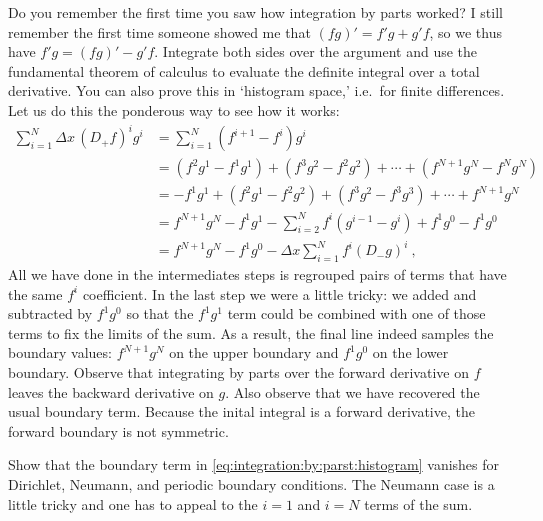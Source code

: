 \begin{example}
Do you remember the first time you saw how integration by parts worked? I still remember the first time someone showed me that $(fg)' = f'g + g'f$, so we thus have $f'g = (fg)' - g'f$. Integrate both sides over the argument and use the fundamental theorem of calculus to evaluate the definite integral over a total derivative. You can also prove this in `histogram space,' i.e.\ for finite differences. Let us do this the ponderous way to see how it works:
\begin{align}
    \sum_{i=1}^N\Delta x\, (D_+f)^i g^i
    &= \sum_{i=1}^N \left(f^{i+1}-f^{i}\right)g^i
    \\
    &= \left(f^2 g^1 - f^1 g^1\right) 
        + \left(f^3 g^2 - f^2 g^2\right) 
        + \cdots
        + \left(f^{N+1} g^N - f^N g^N\right) 
    \\
    &=  - f^1 g^1 
        + \left(f^2 g^1 - f^2 g^2 \right) 
        + \left(f^3 g^2 - f^3 g^3 \right) 
        + \cdots
        + f^{N+1} g^N
    \\
    &= f^{N+1} g^N -  f^1 g^1   -\sum_{i=2}^N f^i\left(g^{i-1} - g^i \right)
    + f^1g^0 - f^1g^0
    \\
    &= f^{N+1} g^N -  f^1 g^0   -\Delta x\sum_{i=1}^N f^i (D_-g)^i \ ,
    \label{eq:integration:by:parst:histogram}
\end{align}
All we have done in the intermediates steps is regrouped pairs of terms that have the same $f^i$ coefficient. In the last step we were a little tricky: we added and subtracted by $f^1g^0$ so that the $f^1g^1$ term could be combined with one of those terms to fix the limits of the sum. As a result, the final line indeed samples the boundary values: $f^{N+1}g^N$ on the upper boundary and $f^1g^0$ on the lower boundary. Observe that integrating by parts over the forward derivative on $f$ leaves the backward derivative on $g$. Also observe that we have recovered the usual boundary term. Because the inital integral is a forward derivative, the forward boundary is not symmetric. 
\end{example}

\begin{exercise}
Show that the boundary term in \eqref{eq:integration:by:parst:histogram} vanishes for Dirichlet, Neumann, and periodic boundary conditions. The Neumann case is a little tricky and one has to appeal to the $i=1$ and $i=N$ terms of the sum. 
\end{exercise}

